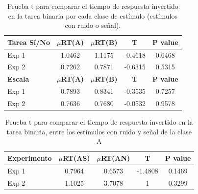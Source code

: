 \begin{table}[h]
\caption[Prueba t para comparar el tiempo de respuesta en la tarea binaria y Escala de Confianza por cada clase de estímulo (ruido y señal)]{Prueba t para comparar el tiempo de respuesta invertido en la tarea binaria por cada clase de estímulo (estímulos con ruido o señal).}
\label{Tabla_RT_AB}
\centering
\begin{tabular}{l |  c c c c}
\toprule
\textbf{Tarea Sí/No} & \textbf{$\mu$RT(A)} & \textbf{$\mu$RT(B)} & \textbf{T} & \textbf{P value}\\
\midrule
Exp 1 & 1.0462 & 1.1175 & -0.4618 & 0.6468 \\
Exp 2 & 0.7262 & 0.7871 & -0.6315 & 0.5315 \\
\midrule
\textbf{Escala} & \textbf{$\mu$RT(A)} & \textbf{$\mu$RT(B)} & \textbf{T} & \textbf{P value}\\
\midrule
Exp 1 & 0.7893 & 0.8341 & -0.3535 & 0.7257 \\
Exp 2 & 0.7636 & 0.7680 & -0.0532 & 0.9578 \\
\bottomrule
\end{tabular}
\end{table}

\begin{table}[h]
\caption[Prueba t para comparar el tiempo de respuesta invertido en la tarea binaria, entre los estímulos con ruido y señal de la clase A]{Prueba t para comparar el tiempo de respuesta invertido en la tarea binaria, entre los estímulos con ruido y señal de la clase A}
\label{Tabla_RT1_A}
\centering
\begin{tabular}{l |  c c c c}
\toprule
\textbf{Experimento} & \textbf{$\mu$RT(AS)} & \textbf{$\mu$RT(AN)} & \textbf{T} & \textbf{P value}\\
\midrule
Exp 1 & 0.7964 & 0.6573 & -1.4808 & 0.1469 \\
Exp 2 & 1.1025 & 3.7078 & 1 & 0.3299 \\
\bottomrule
\end{tabular}
\end{table}

